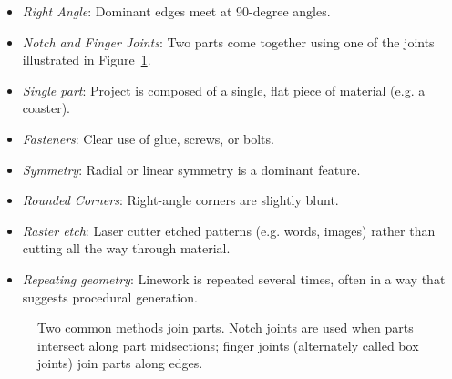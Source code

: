 \documentclass{article}
\begin{document}
\begin{itemize}
\item \textit{Right Angle}: Dominant edges meet at 90-degree angles.
\item \textit{Notch and Finger Joints}: Two parts come together using one of
  the joints illustrated in Figure~\ref{fig:joint}.
\item \textit{Single part}: Project is composed of a single, flat piece of
  material (e.g. a coaster).
\item \textit{Fasteners}: Clear use of glue, screws, or bolts.
\item \textit{Symmetry}: Radial or linear symmetry is a dominant feature.
\item \textit{Rounded Corners}: Right-angle corners are slightly blunt.
\item \textit{Raster etch}: Laser cutter etched patterns (e.g. words,
  images) rather than cutting all the way through material.
\item \textit{Repeating geometry}: Linework is repeated several times,
  often in a way that suggests procedural generation.
\end{itemize}

\begin{figure}[h]
\centering 
{}
\caption{Two common methods join parts. Notch joints are used when
  parts intersect along part midsections; finger joints (alternately
  called box joints) join parts along edges.}
\label{fig:joint}
\end{figure}
\end{document}
